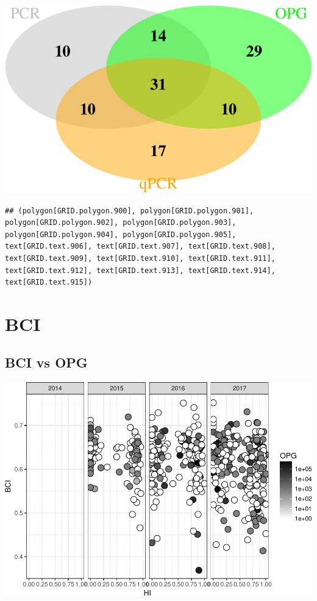 \documentclass[]{article}
\let\origfigure\figure
\let\endorigfigure\endfigure
\renewenvironment{figure}[1][2] { 
    \expandafter\origfigure\expandafter[H] 
} { 
    \endorigfigure 
}
\begin{document}
\begin{figure}[htbp]
\centering
\includegraphics{Data_Analysis_Alice_files/figure-latex/venn2-1.pdf}
\caption{\label{fig:venn1}Comparison of detection: PCR vs flotation vs
qPCŔ}
\end{figure}

\begin{verbatim}
## (polygon[GRID.polygon.900], polygon[GRID.polygon.901], polygon[GRID.polygon.902], polygon[GRID.polygon.903], polygon[GRID.polygon.904], polygon[GRID.polygon.905], text[GRID.text.906], text[GRID.text.907], text[GRID.text.908], text[GRID.text.909], text[GRID.text.910], text[GRID.text.911], text[GRID.text.912], text[GRID.text.913], text[GRID.text.914], text[GRID.text.915])
\end{verbatim}

\section{BCI}\label{bci}

\subsection{BCI vs OPG}\label{bci-vs-opg}

\includegraphics{Data_Analysis_Alice_files/figure-latex/BCI-1.pdf}
\end{document}
